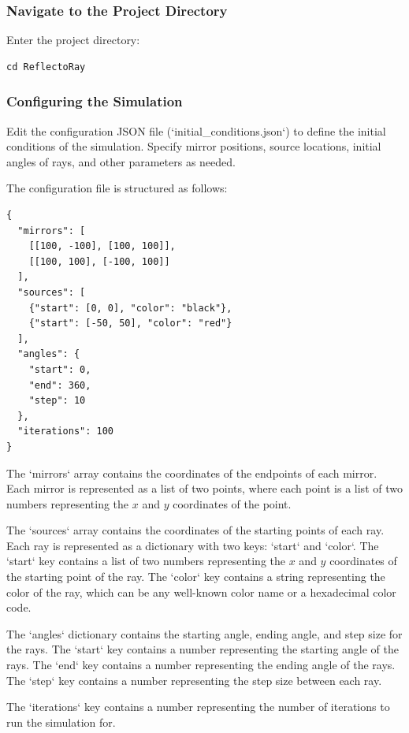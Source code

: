 \documentclass{article}
\begin{document}
\subsubsection{Navigate to the Project Directory}
Enter the project directory:

\begin{verbatim}
cd ReflectoRay
\end{verbatim}

\subsubsection{Configuring the Simulation}

Edit the configuration JSON file (`initial\_conditions.json`) to define the initial conditions of the simulation. Specify mirror positions, source locations, initial angles of rays, and other parameters as needed.

The configuration file is structured as follows:

\begin{verbatim}
{
  "mirrors": [
    [[100, -100], [100, 100]],
    [[100, 100], [-100, 100]]
  ],
  "sources": [
    {"start": [0, 0], "color": "black"},
    {"start": [-50, 50], "color": "red"}
  ],
  "angles": {
    "start": 0,
    "end": 360,
    "step": 10
  },
  "iterations": 100
}
\end{verbatim}

The `mirrors` array contains the coordinates of the endpoints of each mirror. Each mirror is represented as a list of two points, where each point is a list of two numbers representing the $x$ and $y$ coordinates of the point.

The `sources` array contains the coordinates of the starting points of each ray.
Each ray is represented as a dictionary with two keys: `start` and `color`. The
`start` key contains a list of two numbers representing the $x$ and $y$
coordinates of the starting point of the ray. The `color` key contains a string
representing the color of the ray, which can be any well-known color name or a
hexadecimal color code.

The `angles` dictionary contains the starting angle, ending angle, and step size
for the rays. The `start` key contains a number representing the starting angle
of the rays. The `end` key contains a number representing the ending angle of
the rays. The `step` key contains a number representing the step size between
each ray.

The `iterations` key contains a number representing the number of iterations to
run the simulation for.
\end{document}
